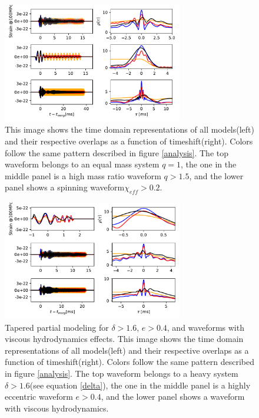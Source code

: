 \begin{figure}[hbt!]
\begin{center}
\includegraphics[width=0.7\textwidth, angle=0]{images/Data_analysis/results/phi-A3.pdf}
\captionsetup{width=0.8\textwidth}
\caption[Tapered partial modeling for $q=1$, $q>1.6$ and $\chi{eff}>0.2$ waveforms]{This image shows the time domain representations of all models(left) and their respective overlaps as a function of timeshift(right). Colors follow the same pattern described in figure \ref{analysis}. The top waveform belongs to an equal mass system $q=1$, the one in the middle panel is a high mass ratio waveform $q>1.5$, and the lower panel shows a spinning waveform$\chi_{eff}>0.2$.}
\end{center}
\end{figure}
\FloatBarrier

\begin{figure}[hbt!]
\begin{center}
\includegraphics[width=0.7\textwidth, angle=0]{images/Data_analysis/results/phi-A4.pdf}
\captionsetup{width=0.8\textwidth}
\caption[Tapered partial modeling for $\delta>1.6$, $e>0.4$, and waveforms with viscous hydrodynamics effects]{Tapered partial modeling for $\delta>1.6$, $e>0.4$, and waveforms with viscous hydrodynamics effects. This image shows the time domain representations of all models(left) and their respective overlaps as a function of timeshift(right). Colors follow the same pattern described in figure \ref{analysis}. The top waveform belongs to a heavy system $\delta>1.6$(see equation \ref{delta}), the one in the middle panel is a highly eccentric waveform $e>0.4$, and the lower panel shows a waveform with viscous hydrodynamics.}
\end{center}
\end{figure}
\FloatBarrier

